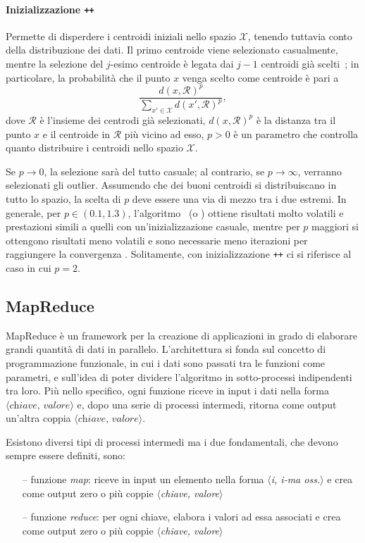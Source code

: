 \documentclass[runningheads]{llncs}
\begin{document}
\paragraph{Inizializzazione \texttt{++}}
Permette di disperdere i centroidi iniziali nello spazio $\mathcal{X}$, tenendo tuttavia conto della distribuzione dei dati. Il primo centroide viene selezionato casualmente, mentre la selezione del $j$-esimo centroide è legata dai $j-1$ centroidi già scelti~\cite{stetco2015}; in particolare, la probabilità che il punto $x$ venga scelto come centroide è pari a 
\[
    \frac{ d(x,\mathcal{R})^{p}}{\sum_{x' \in \mathcal{X}} d(x',\mathcal{R})^{p}},
\]
dove $\mathcal{R}$ è l'insieme dei centrodi già selezionati, $d(x,\mathcal{R})^{p}$ è la distanza tra il punto $x$ e il centroide in $\mathcal{R}$ più vicino ad esso, $p>0$ è un parametro che controlla quanto distribuire i centroidi nello spazio $\mathcal{X}$.

Se $p \rightarrow 0$, la selezione sarà del tutto casuale; al contrario, se $p \rightarrow \infty$, verranno selezionati gli outlier. Assumendo che dei buoni centroidi si distribuiscano in tutto lo spazio, la scelta di $p$ deve essere una via di mezzo tra i due estremi. In generale, per $p \in (0.1,1.3)$, l'algoritmo \fcm\ (o \km) ottiene risultati molto volatili e prestazioni simili a quelli con un'inizializzazione casuale, mentre per $p$ maggiori si ottengono risultati meno volatili e sono necessarie meno iterazioni per raggiungere la convergenza \cite{stetco2015}.
Solitamente, con inizializzazione \texttt{++} ci si riferisce al caso in cui $p = 2$.

\subsection*{MapReduce}
MapReduce è un framework per la creazione di applicazioni in grado di elaborare grandi quantità di dati in parallelo. L'architettura si fonda sul concetto di programmazione funzionale, in cui i dati sono passati tra le funzioni come parametri, e sull'idea di poter dividere l'algoritmo in sotto-processi indipendenti tra loro.
Più nello specifico, ogni funzione riceve in input i dati nella forma $\langle \textit{chiave, valore} \rangle$ e, dopo una serie di processi intermedi, ritorna come output un'altra coppia $\langle \textit{chiave, valore} \rangle $.

Esistono diversi tipi di processi intermedi ma i due fondamentali, che devono sempre essere definiti, sono:
\begin{itemize}
    \item[--] funzione \emph{map}: riceve in input un elemento nella forma $\langle$\emph{i, i-ma oss.}$\rangle$ e crea come output zero o più coppie $\langle$\emph{chiave, valore}$\rangle$\\[-0.2cm]
    \item[--] funzione \emph{reduce}: per ogni chiave, elabora i valori ad essa associati e crea come output zero o più coppie $\langle$\emph{chiave, valore}$\rangle$
\end{itemize}
\end{document}
